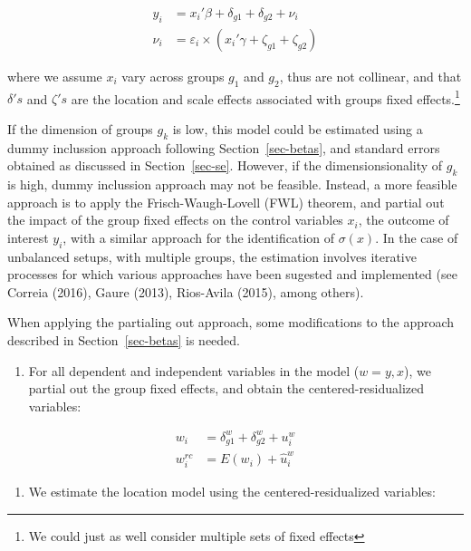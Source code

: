 \documentclass[
  letterpaper,
  DIV=11,
  numbers=noendperiod]{scrartcl}
\providecommand{\tightlist}{%
  \setlength{\itemsep}{0pt}\setlength{\parskip}{0pt}}\usepackage{longtable,booktabs,array}
\begin{document}
\[\begin{aligned}
  y_{i} &= x_{i}' \beta + \delta_{g1} + \delta_{g2} + \nu_i \\
  \nu_i &= \varepsilon_i \times (x_{i}' \gamma + \zeta_{g1} + \zeta_{g2})   
  \end{aligned}
\]

where we assume \(x_{i}\) vary across groups \(g_1\) and \(g_2\), thus
are not collinear, and that \(\delta's\) and \(\zeta's\) are the
location and scale effects associated with groups fixed
effects.\footnote{We could just as well consider multiple sets of fixed
  effects}

If the dimension of groups \(g_k\) is low, this model could be estimated
using a dummy inclussion approach following Section~\ref{sec-betas}, and
standard errors obtained as discussed in Section~\ref{sec-se}. However,
if the dimensionsionality of \(g_k\) is high, dummy inclussion approach
may not be feasible. Instead, a more feasible approach is to apply the
Frisch-Waugh-Lovell (FWL) theorem, and partial out the impact of the
group fixed effects on the control variables \(x_{i}\), the outcome of
interest \(y_{i}\), with a similar approach for the identification of
\(\sigma(x)\). In the case of unbalanced setups, with multiple groups,
the estimation involves iterative processes for which various approaches
have been sugested and implemented (see Correia (2016), Gaure (2013),
Rios-Avila (2015), among others).

When applying the partialing out approach, some modifications to the
approach described in Section~\ref{sec-betas} is needed.

\begin{enumerate}
\def\labelenumi{\arabic{enumi}.}
\tightlist
\item
  For all dependent and independent variables in the model (\(w=y,x\)),
  we partial out the group fixed effects, and obtain the
  centered-residualized variables:
\end{enumerate}

\[\begin{aligned}
w_{i} &= \delta_{g1}^w + \delta_{g2}^w + u_{i}^w \\
w_{i}^{rc} &= E(w_{i}) + \hat{u}_{i}^w
\end{aligned}
\]

\begin{enumerate}
\def\labelenumi{\arabic{enumi}.}
\setcounter{enumi}{1}
\tightlist
\item
  We estimate the location model using the centered-residualized
  variables:
\end{enumerate}
\end{document}
